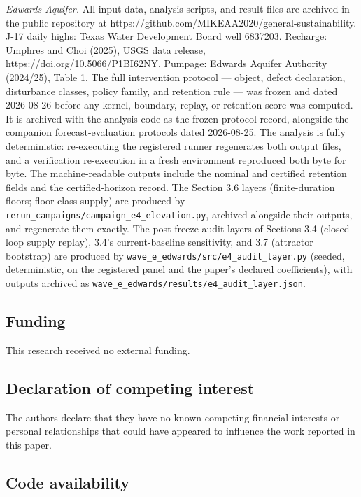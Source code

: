 \documentclass[11pt]{article}
\begin{document}
\emph{Edwards Aquifer.} All input data, analysis scripts, and result files are archived in the
public repository at
https://github.com/MIKEAA2020/general-sustainability. J-17 daily highs:
Texas Water Development Board well 6837203. Recharge: Umphres and Choi
(2025), USGS data release, https://doi.org/10.5066/P1BI62NY. Pumpage:
Edwards Aquifer Authority (2024/25), Table 1. The full intervention
protocol --- object, defect declaration, disturbance classes, policy
family, and retention rule --- was frozen and dated 2026-08-26 before
any kernel, boundary, replay, or retention score was computed. It is
archived with the analysis code as the frozen-protocol record, alongside
the companion forecast-evaluation protocols dated 2026-08-25. The
analysis is fully deterministic: re-executing the registered runner
regenerates both output files, and a verification re-execution in a
fresh environment reproduced both byte for byte. The machine-readable
outputs include the nominal and certified retention fields and the
certified-horizon record. The Section 3.6 layers (finite-duration
floors; floor-class supply) are produced by
\texttt{rerun\_campaigns/campaign\_e4\_elevation.py}, archived alongside
their outputs, and regenerate them exactly. The post-freeze audit layers
of Sections 3.4 (closed-loop supply replay), 3.4's current-baseline
sensitivity, and 3.7 (attractor bootstrap) are produced by
\texttt{wave\_e\_edwards/src/e4\_audit\_layer.py} (seeded,
deterministic, on the registered panel and the paper's declared
coefficients), with outputs archived as
\texttt{wave\_e\_edwards/results/e4\_audit\_layer.json}.

\subsection*{Funding}

This research received no external funding.

\subsection*{Declaration of competing interest}

The authors declare that they have no known competing financial
interests or personal relationships that could have appeared to
influence the work reported in this paper.

\subsection*{Code availability}
\end{document}

